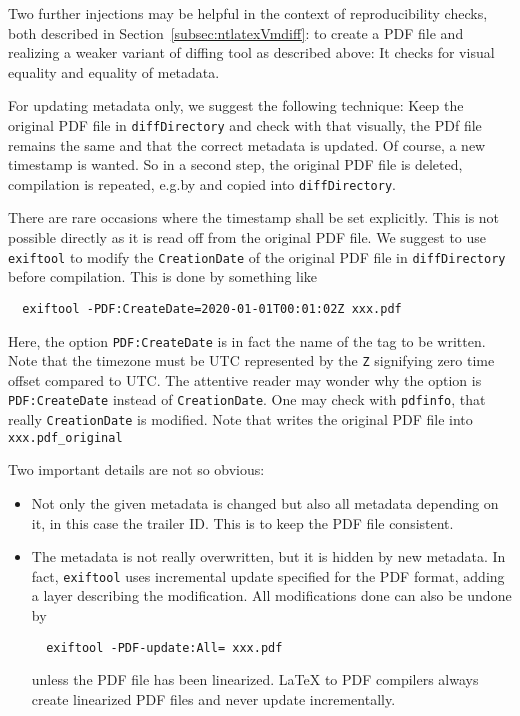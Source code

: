 Two further injections may be helpful in the context of reproducibility checks, 
both described in Section~\ref{subsec:ntlatexVmdiff}: 
 to create a PDF file and  
realizing a weaker variant of diffing tool as described above: 
It checks for visual equality and equality of metadata. 
\medskip


For updating metadata only, we suggest the following technique: 
Keep the original PDF file in \texttt{diffDirectory} 
and check with  that visually, the PDf file remains the same 
and that the correct metadata is updated. 
Of course, a new timestamp is wanted. 
So in a second step, the original PDF file is deleted, 
compilation is repeated, e.g.\@ by  and copied into \texttt{diffDirectory}. 
\medskip


There are rare occasions where the timestamp shall be set explicitly. 
This is not possible directly as it is read off from the original PDF file. 
We suggest to use \texttt{exiftool} to modify the \texttt{CreationDate} 
of the original PDF file in \texttt{diffDirectory} before compilation. 
This is done by something like
%
\begin{verbatim}
  exiftool -PDF:CreateDate=2020-01-01T00:01:02Z xxx.pdf 
\end{verbatim}
%
Here, the option \texttt{PDF:CreateDate} is in fact the name of the tag to be written. 
Note that the timezone must be UTC represented by the \texttt Z 
signifying zero time offset compared to UTC\@. 
The attentive reader may wonder why the option is \texttt{PDF:CreateDate} instead of \texttt{CreationDate}. 
One may check with \texttt{pdfinfo}, that really \texttt{CreationDate} is modified. 
Note that  writes the original PDF file into \texttt{xxx.pdf\_original}

Two important details are not so obvious: 
%
\begin{itemize}
\item
Not only the given metadata is changed but also all metadata depending on it, 
in this case the trailer ID\@. 
This is to keep the PDF file consistent. 
\item 
The metadata is not really overwritten, but it is hidden by new metadata. 
In fact, \texttt{exiftool} uses incremental update specified for the PDF format, 
adding a layer describing the modification. 
All modifications done can also be undone by 
%
\begin{verbatim}
  exiftool -PDF-update:All= xxx.pdf
\end{verbatim}
%
unless the PDF file has been linearized. 
\LaTeX{} to PDF compilers always create linearized PDF files and never update incrementally. 
\end{itemize}


